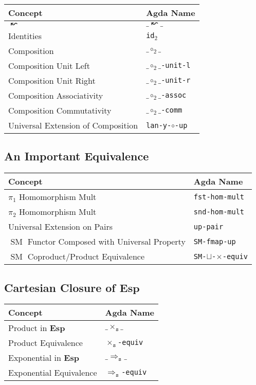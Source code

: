 \documentclass[12pt, parskip, DIV=14]{scrbook}
\renewcommand{\circ}{\vysmwhtcircle}
\newcommand{\SM}{\operatorname{SM}}
\newcommand{\Esp}{\mathbf{Esp}}
\begin{document}
\begin{center}
\begin{tabular}{ll}
  Concept & Agda Name \\
  \hline
  $\leftwavearrow$ & $\_\leftwavearrow\_$ \\
  Identities & \texttt{id$_2$} \\
  Composition & $\_\circ_2\_$ \\
  Composition Unit Left & \texttt{$\_\circ_2\_$-unit-l} \\
  Composition Unit Right & \texttt{$\_\circ_2\_$-unit-r} \\
  Composition Associativity & \texttt{$\_\circ_2\_$-assoc} \\
  Composition Commutativity & \texttt{$\_\circ_2\_$-comm} \\
  Universal Extension of Composition & \texttt{lan-y-$\circ$-up} \\
\end{tabular}
\end{center}

\subsection{An Important Equivalence}

\begin{center}
\begin{tabular}{ll}
  Concept & Agda Name \\
  \hline
  $\pi_1$ Homomorphism Mult & \texttt{fst-hom-mult} \\
  $\pi_2$ Homomorphism Mult & \texttt{snd-hom-mult} \\
  Universal Extension on Pairs & \texttt{up-pair} \\
  $\SM$ Functor Composed with Universal Property & \texttt{SM-fmap-up} \\
  $\SM$ Coproduct/Product Equivalence & \texttt{SM-$\sqcup$-$\times$-equiv} \\
\end{tabular}
\end{center}

\subsection{Cartesian Closure of $\Esp$}

\begin{center}
\begin{tabular}{ll}
  Concept & Agda Name \\
  \hline
  Product in $\Esp$ & $\_\times_\texttt{s}\_$ \\
  Product Equivalence & \texttt{$\times_\texttt{s}$-equiv} \\
  Exponential in $\Esp$ & $\_\Rightarrow_\texttt{s}\_$ \\
  Exponential Equivalence & \texttt{$\Rightarrow_\texttt{s}$-equiv} \\
\end{tabular}
\end{center}
\end{document}
